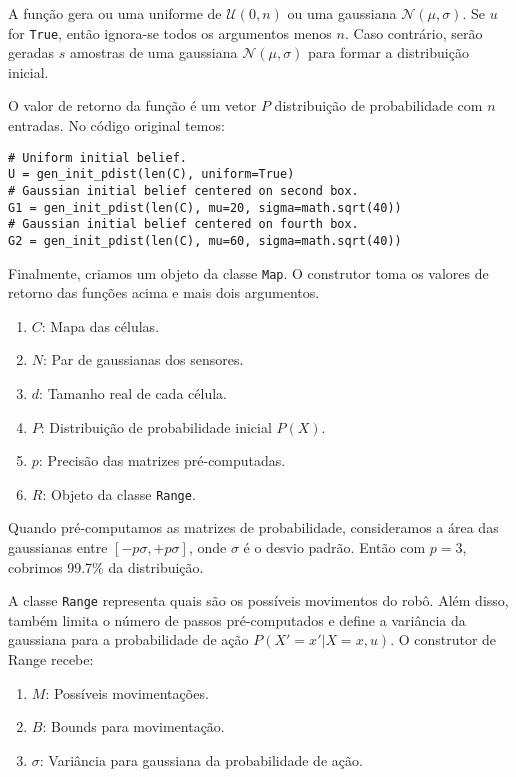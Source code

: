 \documentclass[12pt]{article}
\theoremstyle{plain}
\numberwithin{equation}{section}
\newcommand{\code}[1]{\lstinline[mathescape=true]{#1}}
\begin{document}
A função gera ou uma uniforme de $\mathcal{U}(0, n)$ ou uma gaussiana $\mathcal{N}(\mu,\sigma)$. Se
$u$ for \code{True}, então ignora-se todos os argumentos menos $n$. Caso contrário, serão geradas
$s$ amostras de uma gaussiana $\mathcal{N}(\mu,\sigma)$ para formar a distribuição inicial.

O valor de retorno da função é um vetor $P$ distribuição de probabilidade com $n$ entradas. No
código original temos:\\

\begin{lstlisting}
# Uniform initial belief.
U = gen_init_pdist(len(C), uniform=True)
# Gaussian initial belief centered on second box.
G1 = gen_init_pdist(len(C), mu=20, sigma=math.sqrt(40))
# Gaussian initial belief centered on fourth box.
G2 = gen_init_pdist(len(C), mu=60, sigma=math.sqrt(40))
\end{lstlisting}

Finalmente, criamos um objeto da classe \code{Map}. O construtor toma os valores de retorno das
funções acima e mais dois argumentos.

\begin{enumerate}
  \item $C$: Mapa das células.
  \item $N$: Par de gaussianas dos sensores.
  \item $d$: Tamanho real de cada célula.
  \item $P$: Distribuição de probabilidade inicial $P(X)$.
  \item $p$: Precisão das matrizes pré-computadas.
  \item $R$: Objeto da classe \code{Range}.
\end{enumerate}

Quando pré-computamos as matrizes de probabilidade, consideramos a área das gaussianas entre
$[-p\sigma,+p\sigma]$, onde $\sigma$ é o desvio padrão. Então com $p=3$, cobrimos 99.7\% da
distribuição.

A classe \code{Range} representa quais são os possíveis movimentos do robô. Além disso, também
limita o número de passos pré-computados e define a variância da gaussiana para a probabilidade de
ação $P(X'=x'|X=x,u)$. O construtor de Range recebe:

\begin{enumerate}
  \item $M$: Possíveis movimentações.
  \item $B$: Bounds para movimentação.
  \item $\sigma$: Variância para gaussiana da probabilidade de ação.
\end{enumerate}
\end{document}
